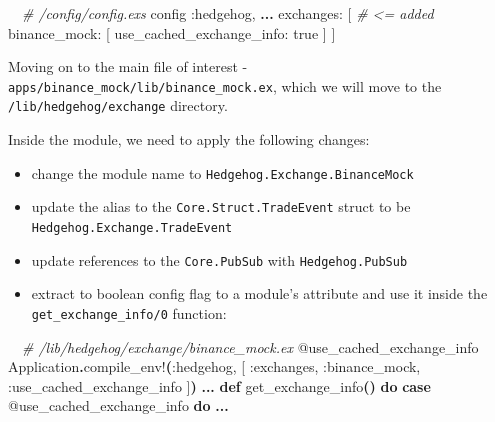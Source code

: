 \documentclass[
  oneside]{book}
\newenvironment{Shaded}{\begin{snugshade}}{\end{snugshade}}
\newcommand{\CommentTok}[1]{\textcolor[rgb]{0.56,0.35,0.01}{\textit{#1}}}
\newcommand{\ConstantTok}[1]{\textcolor[rgb]{0.56,0.35,0.01}{#1}}
\newcommand{\FunctionTok}[1]{\textcolor[rgb]{0.13,0.29,0.53}{\textbf{#1}}}
\newcommand{\KeywordTok}[1]{\textcolor[rgb]{0.13,0.29,0.53}{\textbf{#1}}}
\newcommand{\NormalTok}[1]{#1}
\newcommand{\OperatorTok}[1]{\textcolor[rgb]{0.81,0.36,0.00}{\textbf{#1}}}
\newcommand{\OtherTok}[1]{\textcolor[rgb]{0.56,0.35,0.01}{#1}}
\newcommand{\VariableTok}[1]{\textcolor[rgb]{0.00,0.00,0.00}{#1}}
\providecommand{\tightlist}{%
  \setlength{\itemsep}{0pt}\setlength{\parskip}{0pt}}
\begin{document}
\begin{Shaded}
\begin{Highlighting}[]
  \CommentTok{\# /config/config.exs}
\NormalTok{config }\VariableTok{:hedgehog}\NormalTok{,}
  \OperatorTok{...}
  \VariableTok{exchanges:} \OtherTok{[} \CommentTok{\# \textless{}= added}
    \VariableTok{binance\_mock:} \OtherTok{[} 
      \VariableTok{use\_cached\_exchange\_info:} \ConstantTok{true}
    \OtherTok{]}
  \OtherTok{]}
\end{Highlighting}
\end{Shaded}

Moving on to the main file of interest - \texttt{apps/binance\_mock/lib/binance\_mock.ex}, which we will move to the \texttt{/lib/hedgehog/exchange} directory.

Inside the module, we need to apply the following changes:

\begin{itemize}
\tightlist
\item
  change the module name to \texttt{Hedgehog.Exchange.BinanceMock}
\item
  update the alias to the \texttt{Core.Struct.TradeEvent} struct to be \texttt{Hedgehog.Exchange.TradeEvent}
\item
  update references to the \texttt{Core.PubSub} with \texttt{Hedgehog.PubSub}
\item
  extract to boolean config flag to a module's attribute and use it inside the \texttt{get\_exchange\_info/0} function:
\end{itemize}

\begin{Shaded}
\begin{Highlighting}[]
  \CommentTok{\# /lib/hedgehog/exchange/binance\_mock.ex}
  \OtherTok{@use\_cached\_exchange\_info} \ConstantTok{Application}\OperatorTok{.}\NormalTok{compile\_env!}\FunctionTok{(}\VariableTok{:hedgehog}\NormalTok{, }\OtherTok{[}
                              \VariableTok{:exchanges}\NormalTok{,}
                              \VariableTok{:binance\_mock}\NormalTok{,}
                              \VariableTok{:use\_cached\_exchange\_info}
                            \OtherTok{]}\FunctionTok{)}
  \OperatorTok{...}
  \KeywordTok{def}\NormalTok{ get\_exchange\_info}\FunctionTok{()} \KeywordTok{do}
    \KeywordTok{case} \OtherTok{@use\_cached\_exchange\_info} \KeywordTok{do}
    \OperatorTok{...}
\end{Highlighting}
\end{Shaded}
\end{document}

